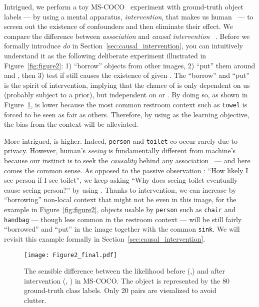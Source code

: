 \documentclass[10pt,twocolumn,letterpaper]{article}
\begin{document}
Intrigued, we perform a toy MS-COCO~\cite{lin2014microsoft} experiment with ground-truth object labels --- by using a mental apparatus, \emph{intervention}, that makes us human~\cite{pearl2018book} --- to screen out the existence of confounders and then eliminate their effect. We compare the difference between \emph{association}  and  \emph{causal intervention} ~\cite{pearl2016causal}. Before we formally introduce \emph{do} in Section~\ref{sec:causal_intervention}, you can intuitively understand it as the following deliberate experiment illustrated in Figure~\ref{fig:figure2}: 1) ``borrow'' objects  from other images, 2) ``put'' them around  and , then 3) test if  still causes the existence of  given . The ``borrow'' and ``put'' is the spirit of intervention, implying that the chance of  is only dependent on us (probably subject to a prior), but independent on  or . By doing so, as shown in Figure~\ref{fig:figure3},  is lower because the most common restroom context such as \texttt{towel} is forced to be seen as fair as others. Therefore, by using  as the learning objective, the bias from the context will be alleviated. 

More intrigued,  is higher. Indeed, \texttt{person} and \texttt{toilet} co-occur rarely due to privacy. However, human's \emph{seeing} is fundamentally different from machine's because our instinct is to seek the \emph{causality} behind any association~\cite{pearl2018book} --- and here comes the common sense. As opposed to the passive observation : ``How likely I see person if I see toilet'', we keep asking ``Why does seeing toilet eventually cause seeing person?'' by using . Thanks to intervention, we can increase  by ``borrowing'' non-local context that might not be even in this image, for the example in Figure~\ref{fig:figure2}, objects usable by \texttt{person} such as \texttt{chair} and \texttt{handbag} --- though less common in the restroom context --- will be still fairly ``borrowed'' and ``put'' in the image together with the common \texttt{sink}. 
We will revisit this example formally in Section~\ref{sec:causal_intervention}. 



\begin{figure}[t]
\begin{center}
\texttt{[image: Figure2\_final.pdf]}
\vspace{-0.3cm}
\end{center}
  \caption{The sensible difference between the likelihood before (\ie,)  and after intervention (\ie, ) in MS-COCO. The object is represented by the 80 ground-truth class labels. Only 20 pairs are visualized to avoid clutter.}
\label{fig:figure3}
\vspace{-0.3cm}
\end{figure}
\end{document}
